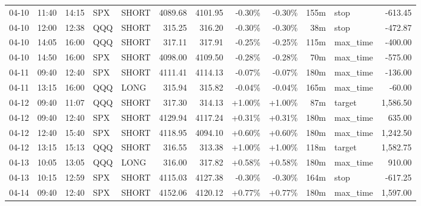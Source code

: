 \documentclass[11pt,a4paper,twoside]{article}
\begin{document}
\begin{center}
\begin{longtable}{>{\color{txtmain}}l l l l l r r r r r >{\color{txtmain}}l r}
04-10 & 11:40 & 14:15 & SPX & SHORT & 4089.68 & 4101.95 & \textcolor{lossred}{-0.30\%} & \textcolor{lossred}{-0.30\%} & 155m & stop & \textcolor{lossred}{-613.45} \\
04-10 & 12:00 & 12:38 & QQQ & SHORT & 315.25 & 316.20 & \textcolor{lossred}{-0.30\%} & \textcolor{lossred}{-0.30\%} & 38m & stop & \textcolor{lossred}{-472.87} \\
04-10 & 14:05 & 16:00 & QQQ & SHORT & 317.11 & 317.91 & \textcolor{lossred}{-0.25\%} & \textcolor{lossred}{-0.25\%} & 115m & max\_time & \textcolor{lossred}{-400.00} \\
04-10 & 14:50 & 16:00 & SPX & SHORT & 4098.00 & 4109.50 & \textcolor{lossred}{-0.28\%} & \textcolor{lossred}{-0.28\%} & 70m & max\_time & \textcolor{lossred}{-575.00} \\
04-11 & 09:40 & 12:40 & SPX & SHORT & 4111.41 & 4114.13 & \textcolor{lossred}{-0.07\%} & \textcolor{lossred}{-0.07\%} & 180m & max\_time & \textcolor{lossred}{-136.00} \\
04-11 & 13:15 & 16:00 & QQQ & LONG & 315.94 & 315.82 & \textcolor{lossred}{-0.04\%} & \textcolor{lossred}{-0.04\%} & 165m & max\_time & \textcolor{lossred}{-60.00} \\
04-12 & 09:40 & 11:07 & QQQ & SHORT & 317.30 & 314.13 & \textcolor{wingreen}{+1.00\%} & \textcolor{wingreen}{+1.00\%} & 87m & target & \textcolor{wingreen}{1,586.50} \\
04-12 & 09:40 & 12:40 & SPX & SHORT & 4129.94 & 4117.24 & \textcolor{wingreen}{+0.31\%} & \textcolor{wingreen}{+0.31\%} & 180m & max\_time & \textcolor{wingreen}{635.00} \\
04-12 & 12:40 & 15:40 & SPX & SHORT & 4118.95 & 4094.10 & \textcolor{wingreen}{+0.60\%} & \textcolor{wingreen}{+0.60\%} & 180m & max\_time & \textcolor{wingreen}{1,242.50} \\
04-12 & 13:15 & 15:13 & QQQ & SHORT & 316.55 & 313.38 & \textcolor{wingreen}{+1.00\%} & \textcolor{wingreen}{+1.00\%} & 118m & target & \textcolor{wingreen}{1,582.75} \\
04-13 & 10:05 & 13:05 & QQQ & LONG & 316.00 & 317.82 & \textcolor{wingreen}{+0.58\%} & \textcolor{wingreen}{+0.58\%} & 180m & max\_time & \textcolor{wingreen}{910.00} \\
04-13 & 10:15 & 12:59 & SPX & SHORT & 4115.03 & 4127.38 & \textcolor{lossred}{-0.30\%} & \textcolor{lossred}{-0.30\%} & 164m & stop & \textcolor{lossred}{-617.25} \\
04-14 & 09:40 & 12:40 & SPX & SHORT & 4152.06 & 4120.12 & \textcolor{wingreen}{+0.77\%} & \textcolor{wingreen}{+0.77\%} & 180m & max\_time & \textcolor{wingreen}{1,597.00} \\

\end{longtable}
\end{center}
\end{document}
